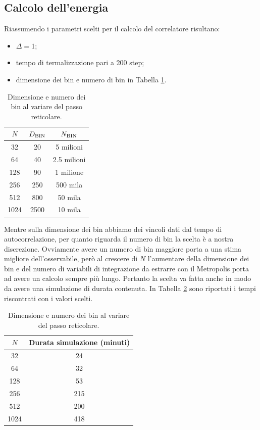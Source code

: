\documentclass{article}
\begin{document}
\subsection{Calcolo dell'energia}
Riassumendo i parametri scelti per il calcolo del correlatore risultano:
\begin{itemize}
    \item $\Delta=1$;
    \item tempo di termalizzazione pari a 200 step;
    \item dimensione dei bin e numero di bin in Tabella \ref{durata simulazione}.
\end{itemize}
\begin{table}[h]
    \centering
    \begin{tabular}{||c c c||} 
     \hline
     $N$ & $D_{\textup{BIN}}$ & $N_{\textup{BIN}}$\\ [0.5ex] 
     \hline\hline
     32 & 20 & 5 milioni\\
     64 & 40 & 2.5 milioni\\
     128 & 90 & 1 milione\\
     256 & 250 & 500 mila\\
     512 & 800 & 50 mila\\
     1024 & 2500 & 10 mila\\[1ex] 
     \hline
    \end{tabular}
    \caption{Dimensione e numero dei bin al variare del passo reticolare.}
    \label{durata simulazione}
\end{table}

Mentre sulla dimensione dei bin abbiamo dei vincoli dati dal tempo di autocorrelazione, per quanto riguarda il numero di bin la scelta è a nostra discrezione. Ovviamente avere un numero di bin maggiore porta a una stima migliore dell'osservabile, però al crescere di $N$ l'aumentare della dimensione dei bin e del numero di variabili di integrazione da estrarre con il Metropolis porta ad avere un calcolo sempre più lungo. Pertanto la scelta va fatta anche in modo da avere una simulazione di durata contenuta. In Tabella \ref{pollo allo spiedo} sono riportati i tempi riscontrati con i valori scelti.
\begin{table}[h]
    \centering
    \begin{tabular}{||c c ||} 
     \hline
     $N$ & Durata simulazione (minuti)\\ [0.5ex] 
     \hline\hline
     32 & 24\\
     64 & 32\\
     128 &53\\
     256 &215\\
     512 &200\\
     1024 &418\\[1ex] 
     \hline
    \end{tabular}
    \caption{Dimensione e numero dei bin al variare del passo reticolare.}
    \label{pollo allo spiedo}
\end{table}
\end{document}
